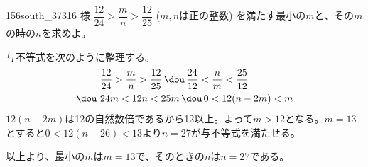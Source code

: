 \begin{prob}{156}{}{south\_37316 様}
 $\dfrac{12}{24}>\dfrac{m}{n}>\dfrac{12}{25}$ ($m, n$は正の整数) を満たす最小の$m$と、その$m$の時の$n$を求めよ。
\end{prob}
与不等式を次のように整理する。
\begin{align*}
 &\frac{12}{24}>\frac{m}{n}>\frac{12}{25} \,\dou\, \frac{24}{12}<\frac{n}{m}<\frac{25}{12} \\
 \dou\,\,& 24m<12n<25m \,\dou\, 0<12(n-2m)<m
\end{align*}
$12(n-2m)$は12の自然数倍であるから12以上。よって$m>12$となる。$m=13$とすると$0<12(n-26)<13$より$n=27$が与不等式を満たせる。

以上より、最小の$m$は$m=13$で、そのときの$n$は$n=27$である。